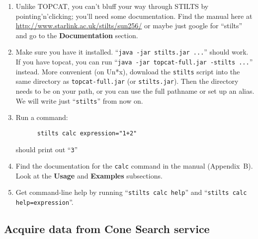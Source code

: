 \documentclass{article}
\newcommand{\lab}[1]{{\bf #1}}
\newcommand{\turl}[1]{{\color{blue}\url{#1}}}
\begin{document}
\begin{enumerate}
\item Unlike TOPCAT, you can't bluff your way through STILTS
      by pointing'n'clicking; you'll need some documentation.
      Find the manual here at \turl{http://www.starlink.ac.uk/stilts/sun256/}
      or maybe just google for ``stilts''
      and go to the \lab{Documentation} section.
\item Make sure you have it installed.
      ``{\tt java -jar stilts.jar ...}'' should work.
      If you have topcat, you can run
      ``{\tt java -jar topcat-full.jar -stilts ...}'' instead.
      More convenient (on Un*x), download the {\tt stilts} script
      into the same directory as {\tt topcat-full.jar} (or {\tt stilts.jar}).
      Then the directory needs to be on your path, or you can use the
      full pathname or set up an alias.
      We will write just ``{\tt stilts}'' from now on.
\item Run a command:
      \vspace*{-2ex}
      \begin{verbatim}
      stilts calc expression="1+2"
      \end{verbatim}
      \vspace*{-4ex}
      should print out ``{\tt 3}''
\item Find the documentation for the {\tt calc} command in the manual
      (Appendix~B).
      Look at the \lab{Usage} and \lab{Examples} subsections.
\item Get command-line help by running ``{\tt stilts calc help}'' and
      ``{\tt stilts calc help=expression}''.
\end{enumerate}

\subsection{Acquire data from Cone Search service}
\newcommand{\preverb}{\vspace{-1ex}}
\newcommand{\postverb}{\vspace{-4ex}}
\end{document}
